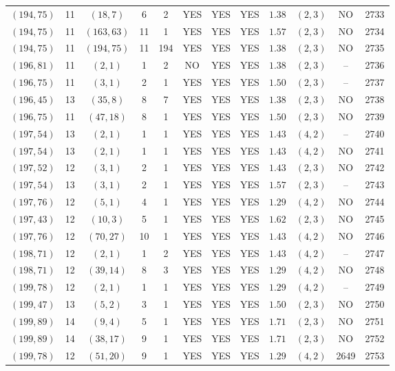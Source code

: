 \begin{longtable}{|c|c|c|c|c|c|c|c|c|c|c|c|}
$(194,75)$ & 11 & $(18,7)$ & 6 & 2 & YES & YES & YES & $1.38$ & $(2,3)$ & NO & 2733\\
$(194,75)$ & 11 & $(163,63)$ & 11 & 1 & YES & YES & YES & $1.57$ & $(2,3)$ & NO & 2734\\
$(194,75)$ & 11 & $(194,75)$ & 11 & 194 & YES & YES & YES & $1.38$ & $(2,3)$ & NO & 2735\\
$(196,81)$ & 11 & $(2,1)$ & 1 & 2 & NO & YES & YES & $1.38$ & $(2,3)$ & -- & 2736\\
$(196,75)$ & 11 & $(3,1)$ & 2 & 1 & YES & YES & YES & $1.50$ & $(2,3)$ & -- & 2737\\
$(196,45)$ & 13 & $(35,8)$ & 8 & 7 & YES & YES & YES & $1.38$ & $(2,3)$ & NO & 2738\\
$(196,75)$ & 11 & $(47,18)$ & 8 & 1 & YES & YES & YES & $1.50$ & $(2,3)$ & NO & 2739\\
$(197,54)$ & 13 & $(2,1)$ & 1 & 1 & YES & YES & YES & $1.43$ & $(4,2)$ & -- & 2740\\
$(197,54)$ & 13 & $(2,1)$ & 1 & 1 & YES & YES & YES & $1.43$ & $(4,2)$ & NO & 2741\\
$(197,52)$ & 12 & $(3,1)$ & 2 & 1 & YES & YES & YES & $1.43$ & $(2,3)$ & NO & 2742\\
$(197,54)$ & 13 & $(3,1)$ & 2 & 1 & YES & YES & YES & $1.57$ & $(2,3)$ & -- & 2743\\
$(197,76)$ & 12 & $(5,1)$ & 4 & 1 & YES & YES & YES & $1.29$ & $(4,2)$ & NO & 2744\\
$(197,43)$ & 12 & $(10,3)$ & 5 & 1 & YES & YES & YES & $1.62$ & $(2,3)$ & NO & 2745\\
$(197,76)$ & 12 & $(70,27)$ & 10 & 1 & YES & YES & YES & $1.43$ & $(4,2)$ & NO & 2746\\
$(198,71)$ & 12 & $(2,1)$ & 1 & 2 & YES & YES & YES & $1.43$ & $(4,2)$ & -- & 2747\\
$(198,71)$ & 12 & $(39,14)$ & 8 & 3 & YES & YES & YES & $1.29$ & $(4,2)$ & NO & 2748\\
$(199,78)$ & 12 & $(2,1)$ & 1 & 1 & YES & YES & YES & $1.29$ & $(4,2)$ & -- & 2749\\
$(199,47)$ & 13 & $(5,2)$ & 3 & 1 & YES & YES & YES & $1.50$ & $(2,3)$ & NO & 2750\\
$(199,89)$ & 14 & $(9,4)$ & 5 & 1 & YES & YES & YES & $1.71$ & $(2,3)$ & NO & 2751\\
$(199,89)$ & 14 & $(38,17)$ & 9 & 1 & YES & YES & YES & $1.71$ & $(2,3)$ & NO & 2752\\
$(199,78)$ & 12 & $(51,20)$ & 9 & 1 & YES & YES & YES & $1.29$ & $(4,2)$ & 2649 & 2753\\

\end{longtable}

